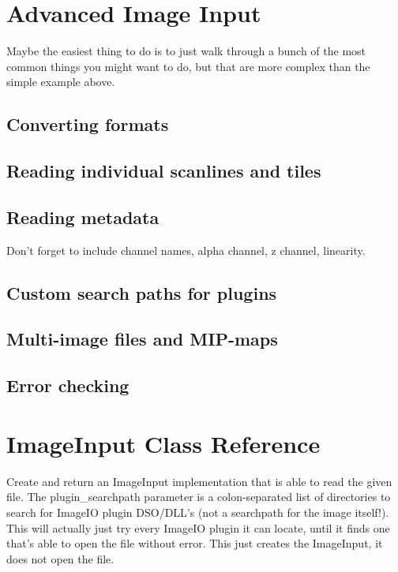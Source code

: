 \section{Advanced Image Input}
\label{sec:advancedimageinput}

Maybe the easiest thing to do is to just walk through a bunch of the
most common things you might want to do, but that are more complex than
the simple example above.

\subsection{Converting formats}
\label{sec:imageinput:convertingformat}

\subsection{Reading individual scanlines and tiles}
\label{sec:imageinput:reading}

\subsection{Reading metadata}
\label{sec:imageinput:metadata}

Don't forget to include channel names, alpha channel, z channel,
linearity.

\subsection{Custom search paths for plugins}
\label{sec:imageinput:searchpaths}

\subsection{Multi-image files and MIP-maps}
\label{sec:imageinput:multiimage}

\subsection{Error checking}
\label{sec:imageinput:errors}

\section{{\kw ImageInput} Class Reference}

Create and return an {\kw ImageInput} implementation that is able
to read the given file.  The {\kw plugin_searchpath} parameter is a
colon-separated list of directories to search for ImageIO plugin
DSO/DLL's (not a searchpath for the image itself!).  This will
actually just try every ImageIO plugin it can locate, until it
finds one that's able to open the file without error.  This just
creates the {\kw ImageInput}, it does not open the file.
\apiend

